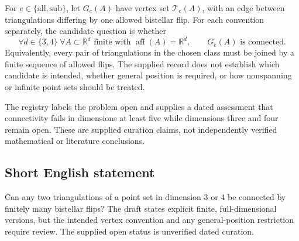 \documentclass[11pt]{article}
\newcommand{\R}{\mathbb{R}}
\begin{document}
For \(e\in\{\mathrm{all},\mathrm{sub}\}\), let \(G_e(A)\) have vertex set \(\mathcal T_e(A)\), with an edge between triangulations differing by one allowed bistellar flip. For each convention separately, the candidate question is whether
\[
 \forall d\in\{3,4\}\ \forall A\subset\R^d\text{ finite with }\operatorname{aff}(A)=\R^d,\qquad G_e(A)\text{ is connected}.
\]
Equivalently, every pair of triangulations in the chosen class must be joined by a finite sequence of allowed flips. The supplied record does not establish which candidate is intended, whether general position is required, or how nonspanning or infinite point sets should be treated.

The registry labels the problem open and supplies a dated assessment that connectivity fails in dimensions at least five while dimensions three and four remain open. These are supplied curation claims, not independently verified mathematical or literature conclusions.
\subsection{Short English statement}
Can any two triangulations of a point set in dimension \(3\) or \(4\) be connected by finitely many bistellar flips? The draft states explicit finite, full-dimensional versions, but the intended vertex convention and any general-position restriction require review. The supplied open status is unverified dated curation.
\end{document}
